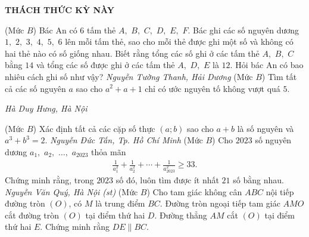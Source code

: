 \begin{center}
	\vspace*{-5pt}
	\textbf{\color{thachthuctoanhoc}\color{thachthuctoanhoc}\color{thachthuctoanhoc}THÁCH THỨC KỲ NÀY}
	\vspace*{-5pt}
\end{center}
\begin{multicols}{2}
	\setlength{\abovedisplayskip}{4pt}
	\setlength{\belowdisplayskip}{4pt}
	{}
	(Mức $B$) Bác An có $6$ tấm thẻ $A,$ $B,$ $C,$ $D,$ $E,$ $F$. Bác ghi các số nguyên dương $1,$ $2,$ $3,$ $4,$ $5,$ $6$ lên mỗi tấm thẻ, sao cho mỗi thẻ được ghi một số và không có hai thẻ nào có số giống nhau. Biết rằng tổng các số ghi ở các tấm thẻ $A,$ $B,$ $C$ bằng $14$ và tổng các số được ghi ở các tấm thẻ $A,$ $D,$ $E$ là $12$. Hỏi bác An có bao nhiêu cách ghi số như vậy?
	\vskip 0.3cm
	\hfill	\textit{Nguyễn Tường Thanh, Hải Dương}
	\vskip 0.3cm
	{}
	(Mức $B$) Tìm tất cả các số nguyên $a$ sao cho $a^2+a+1$ chỉ có ước nguyên tố không vượt quá $5$. 
	\begin{flushright}
		\textit{Hà Duy Hưng, Hà Nội}
	\end{flushright}
	{}
	(Mức $B$) Xác định tất cả các cặp số thực $(a;b)$ sao cho $a+b$ là số nguyên và $a^3+b^3=2$. 
	\vskip 0.1cm
	\hfill	\textit{Nguyễn Đức Tấn, Tp. Hồ Chí Minh}
	\vskip 0.1cm
	{}
	(Mức $B$) Cho $2023$ số nguyên dương $a_1,$ $a_2,$ $\ldots,$ $a_{2023}$ thỏa mãn
	\begin{align*}
		\frac{1}{a_1^2}+\frac{1}{a_2^2}+\cdots+\frac{1}{a_{2023}^2}\ge 33.
	\end{align*}
	Chứng minh rằng, trong $2023$ số đó, luôn tìm được ít nhất $21$ số bằng nhau.  
	\vskip 0.1cm
	\hfill	\textit{Nguyễn Văn Quý, Hà Nội (st)}
	\vskip 0.1cm
	{}
	(Mức $B$) Cho tam giác không cân $ABC$ nội tiếp đường tròn $(O)$, có $M$ là trung điểm $BC$. Đường tròn ngoại tiếp tam giác $AMO$ cắt đường tròn $(O)$ tại điểm thứ hai $D$. Đường thẳng $AM$ cắt $(O)$  tại điểm thứ hai $E$. Chứng minh rằng $DE\| BC$. 
	\begin{center}
		\begin{tikzpicture}[thachthuctoanhoc,scale=0.6, node font=\small]

\end{tikzpicture}
\end{center}
\end{multicols}
